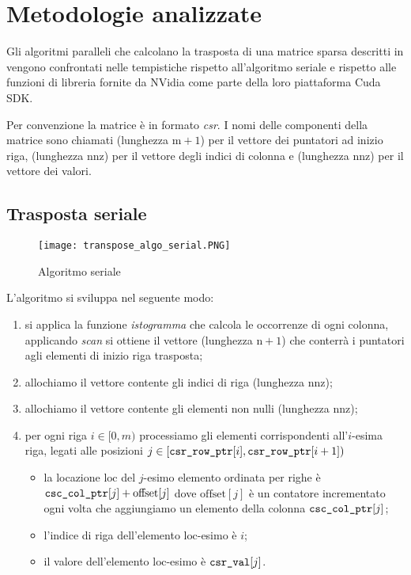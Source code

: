 
\section{Metodologie analizzate}\label{metodologie}

Gli algoritmi paralleli che calcolano la trasposta di una matrice sparsa descritti in \cite{parallelTrans} vengono confrontati nelle tempistiche rispetto all'algoritmo seriale e rispetto alle funzioni di libreria \cuSPARSE{} fornite da NVidia come parte della loro piattaforma Cuda SDK. 

Per convenzione la matrice è in formato \emph{csr}. I nomi delle componenti della matrice sono chiamati  (lunghezza $\mathrm{m}+1$) per il vettore dei puntatori ad inizio riga,  (lunghezza $\mathrm{nnz}$) per il vettore degli indici di colonna e  (lunghezza $\mathrm{nnz}$) per il vettore dei valori. 
		
\subsection{Trasposta seriale}

\begin{figure}[htbp]
    \centering
	\texttt{[image: transpose\_algo\_serial.PNG]}
	\caption{Algoritmo seriale}
	\label{transpose_algo_serial}
\end{figure}

L'algoritmo si sviluppa nel seguente modo:
\begin{enumerate}
    \item si applica la funzione \emph{istogramma}  che calcola le occorrenze di ogni colonna, applicando \emph{scan} si ottiene il vettore  (lunghezza $\mathrm{n}+1$) che conterrà i puntatori agli elementi di inizio riga trasposta;
    \item allochiamo il vettore  contente gli indici di riga (lunghezza $\mathrm{nnz}$);
    \item allochiamo il vettore  contente gli elementi non nulli (lunghezza $\mathrm{nnz}$);
    \item per ogni riga $i \in [0, m)$ processiamo gli elementi corrispondenti all'$i$-esima riga, legati alle posizioni $j \in [\texttt{csr\_row\_ptr}[i], \texttt{csr\_row\_ptr}[i+1])$
    \begin{itemize}
        \item la locazione $\mathrm{loc}$ del $j$-esimo elemento ordinata per righe è $\texttt{csc\_col\_ptr}[j] + \mathrm{offset}[j]$ dove $\mathrm{offset}[j]$ è un contatore incrementato ogni volta che aggiungiamo un elemento della colonna $\texttt{csc\_col\_ptr}[j]$;
        \item l'indice di riga dell'elemento $\mathrm{loc}$-esimo è $i$;
        \item il valore dell'elemento  $\mathrm{loc}$-esimo è $\texttt{csr\_val}[j]$.
    \end{itemize}
\end{enumerate}

